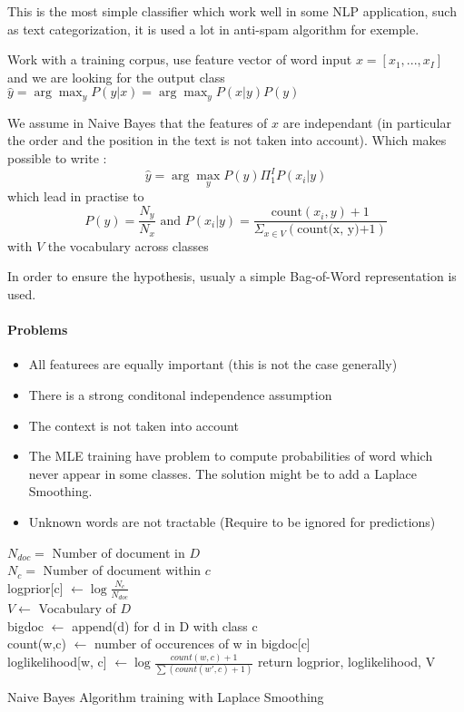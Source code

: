 			This is the most simple classifier which work well in some NLP application, such as text categorization, it is used a lot in anti-spam algorithm for exemple. 

			Work with a training corpus, use feature vector of word input $x = [x_1, ..., x_I]$
			and we are looking for the output class $\hat y = \arg \max_y P(y|x) = \arg \max_y P(x | y)P(y)$

			We assume in Naive Bayes that the features of $x$ are independant (in particular the order and the position in the text is not taken into account). Which makes possible to write : 
			\[
				\hat y = \arg \max_y P(y) \Pi_1^I P(x_i | y)
			\]
			which lead in practise to
			\[
				P(y) = \frac{N_y}{N_x} \text{ and } P(x_i | y) = \frac{\text{count}(x_i, y)+1}{\Sigma_{x\in V}(\text{count(x, y)+1})}
			\] with $V$ the vocabulary across classes

			In order to ensure the hypothesis, usualy a simple Bag-of-Word representation is used.

			\paragraph*{Problems}

				\begin{itemize}
					\item All featurees are equally important (this is not the case generally)
					\item There is a strong conditonal independence assumption
					\item The context is not taken into account
					\item The MLE training have problem to compute probabilities of word which never appear in some classes. The solution might be to add a Laplace Smoothing.
					\item Unknown words are not tractable (Require to be ignored for predictions)
				\end{itemize}

			\begin{algorithm}[H]

				
					{
						$N_{doc} =$ Number of document in $D$\\
						$N_c = $ Number of document within $c$\\
						logprior[c] $\leftarrow \log \frac{N_c}{N_{doc}}$\\
						$V \leftarrow$ Vocabulary of $D$\\
						bigdoc $\leftarrow$ append(d) for d in D with class c\\
						{
							count(w,c) $\leftarrow$ number of occurences of w in bigdoc[c]\\
							loglikelihood[w, c] $\leftarrow \log \frac{count(w,c) +1}{\sum (count(w', c)+1)}$   
						} 
					}
				return logprior, loglikelihood, V
				
				\caption{Naive Bayes Algorithm training with Laplace Smoothing}
			\end{algorithm}


